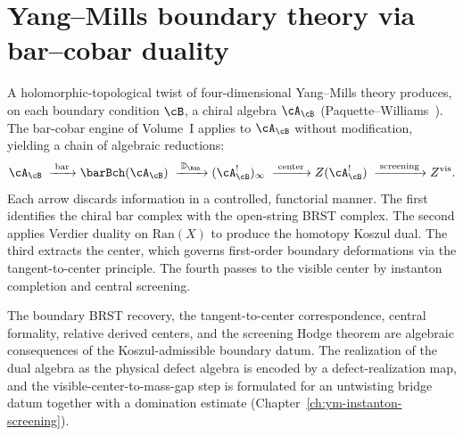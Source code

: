 \chapter{Yang--Mills boundary theory via bar--cobar duality}
\label{ch:ym-boundary-theory}


A holomorphic-topological twist of four-dimensional Yang--Mills theory
produces, on each boundary condition $\cB$, a chiral algebra
$\cA_{\cB}$ (Paquette--Williams~\cite{PW22}). The bar-cobar engine of
Volume~I applies to $\cA_{\cB}$ without modification, yielding a chain of
algebraic reductions:
\[
\cA_{\cB}
\;\xrightarrow{\;\text{bar}\;}
\barBch(\cA_{\cB})
\;\xrightarrow{\;\mathbb{D}_{\Ran}\;}
(\cA_{\cB}^!)_\infty
\;\xrightarrow{\;\text{center}\;}
Z(\cA_{\cB}^!)
\;\xrightarrow{\;\text{screening}\;}
Z^{\mathrm{vis}}.
\]
Each arrow discards information in a controlled, functorial manner.
The first identifies the chiral bar complex with the open-string BRST
complex. The second applies Verdier duality on $\mathrm{Ran}(X)$ to
produce the homotopy Koszul dual. The third extracts the center, which
governs first-order boundary deformations via the tangent-to-center
principle. The fourth passes to the visible center by instanton
completion and central screening.

\begin{remark}
\label{rem:ym-chain-scope}
The boundary BRST recovery, the tangent-to-center correspondence,
central formality, relative derived centers, and the screening Hodge
theorem are algebraic consequences of the Koszul-admissible boundary
datum. The realization of the dual algebra as the physical defect
algebra is encoded by a defect-realization map, and the
visible-center-to-mass-gap step is formulated for an untwisting bridge
datum together with a domination estimate
(Chapter~\ref{ch:ym-instanton-screening}).
\end{remark}

